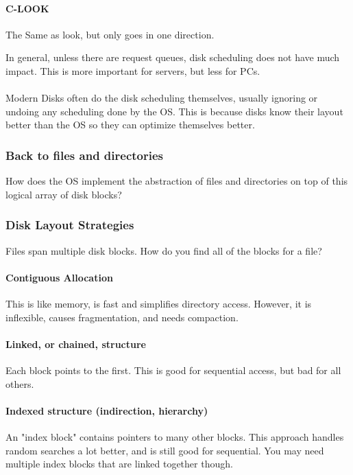 \documentclass{article}
\begin{document}
\paragraph{C-LOOK} The Same as look, but only goes in one direction.

In general, unless there are request queues, disk scheduling does not have much impact. This is more important for servers, but less for PCs.
\\
\\
Modern Disks often do the disk scheduling themselves, usually ignoring or undoing any scheduling done by the OS. This is because disks know their layout better than the OS so they can optimize themselves better.

\subsubsection{Back to files and directories}

How does the OS implement the abstraction of files and directories on top of this logical array of disk blocks?

\subsubsection{Disk Layout Strategies}

Files span multiple disk blocks. How do you find all of the blocks for a file?

\paragraph{Contiguous Allocation} This is like memory, is fast and simplifies directory access. However, it is inflexible, causes fragmentation, and needs compaction.

\paragraph{Linked, or chained, structure} Each block points to the first. This is good for sequential access, but bad for all others.

\paragraph{Indexed structure (indirection, hierarchy)} An "index block" contains pointers to many other blocks. This approach handles random searches a lot better, and is still good for sequential. You may need multiple index blocks that are linked together though.
\end{document}
